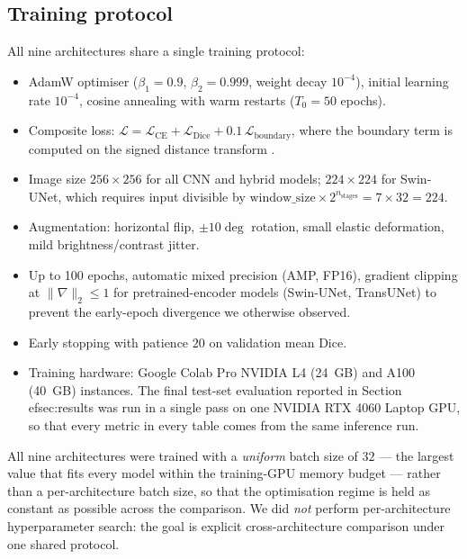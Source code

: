 

\subsection{Training protocol}
\label{sec:methods-training}

All nine architectures share a single training protocol:
\begin{itemize}[leftmargin=*,nosep]
\item AdamW optimiser ($\beta_1{=}0.9$, $\beta_2{=}0.999$,
      weight decay $10^{-4}$), initial learning rate $10^{-4}$, cosine
      annealing with warm restarts ($T_0{=}50$ epochs).
\item Composite loss: $\mathcal{L} = \mathcal{L}_{\text{CE}}
      + \mathcal{L}_{\text{Dice}} + 0.1\, \mathcal{L}_{\text{boundary}}$,
      where the boundary term is computed on the signed distance
      transform \citep{kervadec2019}.
\item Image size $256\times 256$ for all CNN and hybrid models;
      $224\times 224$ for Swin-UNet, which requires input divisible by
      $\text{window\_size}\times 2^{n_\text{stages}} = 7\times 32 = 224$.
\item Augmentation: horizontal flip, $\pm 10\deg$ rotation, small elastic
      deformation, mild brightness/contrast jitter.
\item Up to 100 epochs, automatic mixed precision (AMP, FP16), gradient
      clipping at $\|\nabla\|_2 \le 1$ for pretrained-encoder models
      (Swin-UNet, TransUNet) to prevent the early-epoch divergence we
      otherwise observed.
\item Early stopping with patience $20$ on validation mean Dice.
\item Training hardware: Google Colab Pro NVIDIA L4 (24~GB) and A100
      (40~GB) instances. The final test-set evaluation reported in
      Section~
ef{sec:results} was run in a single pass on one NVIDIA
      RTX 4060 Laptop GPU, so that every metric in every table comes from
      the same inference run.
\end{itemize}

All nine architectures were trained with a \emph{uniform} batch size of
$32$ --- the largest value that fits every model within the training-GPU
memory budget --- rather than a per-architecture batch size, so that the
optimisation regime is held as constant as possible across the comparison.
We did \emph{not} perform per-architecture hyperparameter search: the goal
is explicit cross-architecture comparison under one shared protocol.

